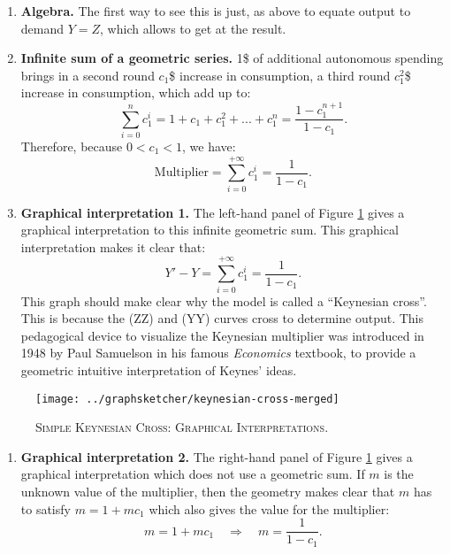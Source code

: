 \documentclass[]{book}
\providecommand{\tightlist}{%
  \setlength{\itemsep}{0pt}\setlength{\parskip}{0pt}}
\theoremstyle{definition}
\theoremstyle{definition}
\theoremstyle{definition}
\theoremstyle{remark}
\begin{document}
\begin{enumerate}
\def\labelenumi{\arabic{enumi}.}
\item
  \textbf{Algebra.} The first way to see this is just, as above to
  equate output to demand \(Y=Z\), which allows to get at the result.
\item
  \textbf{Infinite sum of a geometric series.} 1\$ of additional
  autonomous spending brings in a second round \(c_{1}\)\$ increase in
  consumption, a third round \(c_{1}^{2}\)\$ increase in consumption,
  which add up to:
  \[\sum_{i=0}^{n}c_{1}^{i}=1+c_{1}+c_{1}^{2}+...+c_{1}^{n}=\frac{1-c_{1}^{n+1}}{1-c_{1}}.\]
  Therefore, because \(0<c_{1}<1\), we have:
  \[\text{Multiplier}=\sum_{i=0}^{+\infty}c_{1}^{i}=\frac{1}{1-c_{1}}.\]
\item
  \textbf{Graphical interpretation 1.} The left-hand panel of Figure
  \ref{fig:keynes-graphical} gives a graphical interpretation to this
  infinite geometric sum. This graphical interpretation makes it clear
  that: \[Y'-Y=\sum_{i=0}^{+\infty}c_{1}^{i}=\frac{1}{1-c_{1}}.\] This
  graph should make clear why the model is called a ``Keynesian cross''.
  This is because the (ZZ) and (YY) curves cross to determine output.
  This pedagogical device to visualize the Keynesian multiplier was
  introduced in 1948 by Paul Samuelson in his famous \emph{Economics}
  textbook, to provide a geometric intuitive interpretation of Keynes'
  ideas.
\end{enumerate}




\begin{figure}

{\centering \texttt{[image: ../graphsketcher/keynesian-cross-merged]} 

}

\caption{\textsc{Simple Keynesian Cross: Graphical
Interpretations}.}\label{fig:keynes-graphical}
\end{figure}

\begin{enumerate}
\def\labelenumi{\arabic{enumi}.}
\setcounter{enumi}{3}
\tightlist
\item
  \textbf{Graphical interpretation 2.} The right-hand panel of Figure
  \ref{fig:keynes-graphical} gives a graphical interpretation which does
  not use a geometric sum. If \(m\) is the unknown value of the
  multiplier, then the geometry makes clear that \(m\) has to satisfy
  \(m=1+mc_{1}\) which also gives the value for the multiplier:
  \[m=1+mc_{1} \quad\Rightarrow\quad m=\frac{1}{1-c_{1}}.\]
\end{enumerate}
\end{document}
